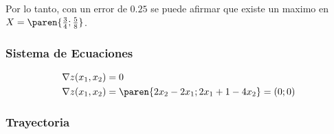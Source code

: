 \begin{homeworkProblem}
Por lo tanto, con un error de $0.25$ se puede afirmar que existe un maximo en $X=\paren{\frac{3}{4};\frac{5}{8}}$.

\subsubsection{Sistema de Ecuaciones}
\begin{align*}
    &\nabla z(x_1,x_2)=0\\
    &\nabla z(x_1,x_2)=\paren{2x_2-2x_1;2x_1+1-4x_2}=(0;0)\\
\end{align*}


\subsubsection{Trayectoria}


\end{homeworkProblem}